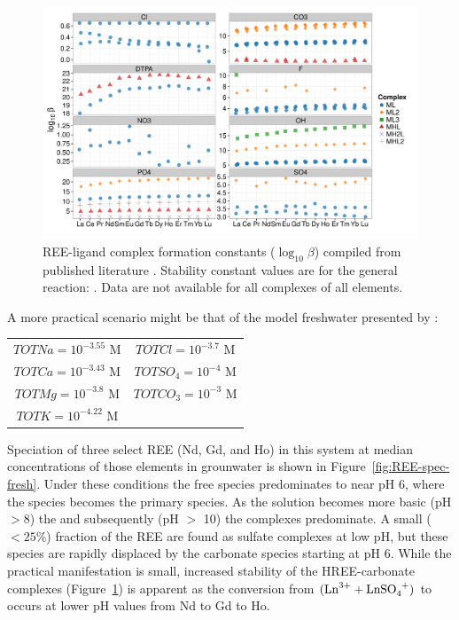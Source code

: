 \begin{figure}[htbp]
\begin{center}
\includegraphics[width = \textwidth]{REE-aq-chem-figs/REE-stab-const-freeY.pdf}
\caption[REE-ligand complex formation constants ($\log_{10} \beta$) compiled from published literature.]{REE-ligand complex formation constants ($\log_{10} \beta$) compiled from published literature \citep{Wood_CG_1990, Lee_GCA_1992, Millero_GCA_1992, Liu_JSC_1998, Klugness_Poly_2000, Luo_JSC_2000, Luo_JSC_2001, Grimes_JSC_2014}. Stability constant values are for the general reaction:
.
Data are not available for all complexes of all elements.}
\label{fig:REE-stab-consts}
\end{center}
\end{figure}

A more practical scenario might be that of the model freshwater presented by \citet{Morel_Hering}:
\begin{center}
\begin{tabular}{cc}
$TOTNa = 10^{-3.55}\text{ M}$ & $TOTCl = 10^{-3.7}\text{ M}$\\
$TOTCa = 10^{-3.43}\text{ M}$ & $TOTSO_4 = 10^{-4}\text{ M}$\\
$TOTMg = 10^{-3.8}\text{ M}$ & $TOTCO_3 = 10^{-3}\text{ M}$\\
$TOTK = 10^{-4.22}\text{ M}$ &  \\
\end{tabular}
\end{center}
Speciation of three select REE (Nd, Gd, and Ho) in this system at median concentrations of those elements in grounwater \citep{Noack_EST_2014} is shown in Figure~\ref{fig:REE-spec-fresh}.
Under these conditions the free  species predominates to near pH 6, where the  species becomes the primary species.
As the solution becomes more basic (pH $>8$) the  and subsequently (pH $>$ 10) the  complexes predominate.
A small ($<25\%$) fraction of the REE are found as sulfate complexes at low pH, but these species are rapidly displaced by the carbonate species starting at pH 6.
While the practical manifestation is small, increased stability of the HREE-carbonate complexes (Figure~\ref{fig:REE-stab-consts}) is apparent as the conversion from $(\ce{Ln^3+} + \ce{LnSO4+})$ to  occurs at lower pH values from Nd to Gd to Ho.

